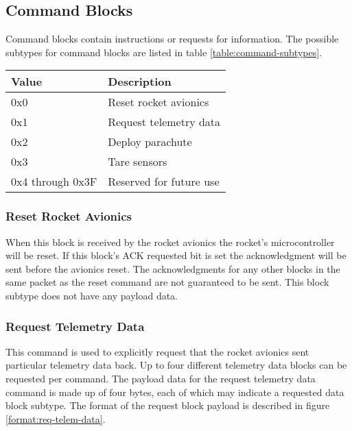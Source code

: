 \subsection{Command Blocks}
Command blocks contain instructions or requests for information. The possible
subtypes for command blocks are listed in table \ref{table:command-subtypes}.

\begin{table*}[htb]
\centering
\begin{tabular}{@{}ll@{}}
\toprule
Value               &   Description \\
\midrule
0x0                 &   Reset rocket avionics \\
0x1                 &   Request telemetry data \\
0x2                 &   Deploy parachute \\
0x3                 &   Tare sensors \\
0x4 through 0x3F    &   Reserved for future use \\
\bottomrule
\end{tabular}
\caption{Command Block Subtypes}
\label{table:command-subtypes}
\end{table*}

\subsubsection{Reset Rocket Avionics}
When this block is received by the rocket avionics the rocket’s microcontroller
will be reset. If this block’s ACK requested bit is set the acknowledgment will
be sent before the avionics reset. The acknowledgments for any other blocks in
the same packet as the reset command are not guaranteed to be sent. This block
subtype does not have any payload data.

\subsubsection{Request Telemetry Data}
This command is used to explicitly request that the rocket avionics sent
particular telemetry data back. Up to four different telemetry data blocks can
be requested per command. The payload data for the request telemetry data
command is made up of four bytes, each of which may indicate a requested data
block subtype. The format of the request block payload is described in figure
\ref{format:req-telem-data}.

